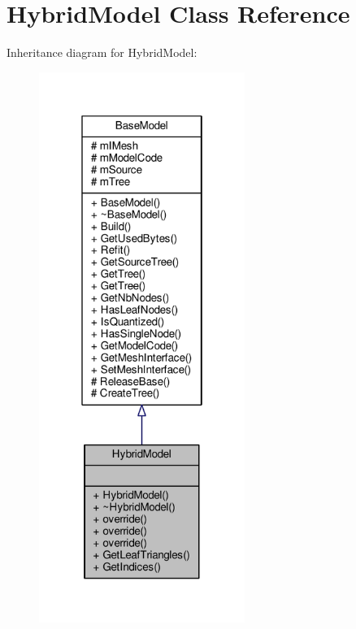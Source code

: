 \hypertarget{classHybridModel}{}\section{Hybrid\+Model Class Reference}
\label{classHybridModel}


Inheritance diagram for Hybrid\+Model\+:
\nopagebreak
\begin{figure}[H]
\begin{center}
\leavevmode
\includegraphics[width=190pt]{d4/d1a/classHybridModel__inherit__graph}
\end{center}
\end{figure}


